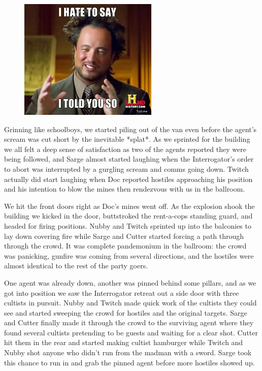 \begin{figure}
	\begin{center}
		\includegraphics[width=\figwidth]{pics/5/13.png}
	\end{center}
\end{figure}
Grinning like schoolboys, we started piling out of the van even before the agent’s scream was cut short by the inevitable *splat*. 
As we sprinted for the building we all felt a deep sense of satisfaction as two of the agents reported they were being followed, and Sarge almost started laughing when the Interrogator’s order to abort was interrupted by a gurgling scream and comms going down. 
Twitch actually did start laughing when Doc reported hostiles approaching his position and his intention to blow the mines then rendezvous with us in the ballroom.

We hit the front doors right as Doc’s mines went off. 
As the explosion shook the building we kicked in the door, buttstroked the rent-a-cops standing guard, and headed for firing positions. 
Nubby and Twitch sprinted up into the balconies to lay down covering fire while Sarge and Cutter started forcing a path through through the crowd. 
It was complete pandemonium in the ballroom: 
the crowd was panicking, gunfire was coming from several directions, and the hostiles were almost identical to the rest of the party goers.

One agent was already down, another was pinned behind some pillars, and as we got into position we saw the Interrogator retreat out a side door with three cultists in pursuit. 
Nubby and Twitch made quick work of the cultists they could see and started sweeping the crowd for hostiles and the original targets. 
Sarge and Cutter finally made it through the crowd to the surviving agent where they found several cultists pretending to be guests and waiting for a clear shot.
Cutter hit them in the rear and started making cultist hamburger while Twitch and Nubby shot anyone who didn’t run from the madman with a sword. 
Sarge took this chance to run in and grab the pinned agent before more hostiles showed up.

